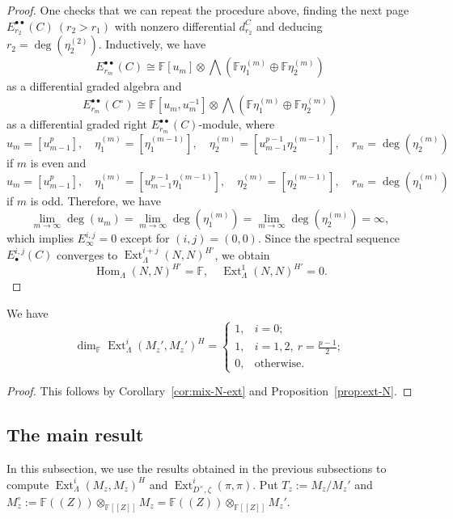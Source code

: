 \documentclass[11pt,a4paper]{article} %
\def\FF{\mathbb{F}}
\def\deg{\operatorname{deg}}
\def\dim{\operatorname{dim}}
\def\Ext{\operatorname{Ext}} %
\def\Hom{\operatorname{Hom}}
\begin{document}
\begin{proof}
    One checks that we can repeat the procedure above, finding the next page $E_{r_2}^{\bullet\bullet}(C)~(r_2>r_1)$ with nonzero differential $d_{r_2}^C$ and deducing $r_2=\deg(\eta_2^{(2)})$. Inductively, we have 
    \[
    E_{r_m}^{\bullet\bullet}(C)\cong\FF[u_m]\otimes\bigwedge(\FF\eta_1^{(m)}\oplus\FF\eta_2^{(m)})
    \]
    as a differential graded algebra and
    \[
    E_{r_m}^{\bullet\bullet}(C^\circ)\cong\FF[u_m,u_m^{-1}]\otimes\bigwedge(\FF\eta_1^{(m)}\oplus\FF\eta_2^{(m)})
    \]
    as a differential graded right $E_{r_m}^{\bullet\bullet}(C)$-module, where
    \[
    u_m=[u_{m-1}^p],\quad\eta_1^{(m)}=[\eta_1^{(m-1)}],\quad\eta_2^{(m)}=[u_{m-1}^{p-1}\eta_2^{(m-1)}],\quad r_m=\deg(\eta_2^{(m)})
    \]
    if $m$ is even and
    \[
    u_m=[u_{m-1}^p],\quad\eta_1^{(m)}=[u_{m-1}^{p-1}\eta_1^{(m-1)}],\quad\eta_2^{(m)}=[\eta_2^{(m-1)}],\quad r_m=\deg(\eta_1^{(m)})
    \]
    if $m$ is odd. Therefore, we have
    \[
    \lim_{m\to\infty}\deg(u_m)=\lim_{m\to\infty}\deg(\eta_1^{(m)})=\lim_{m\to\infty}\deg(\eta_2^{(m)})=\infty,
    \]
    which implies $E_{\infty}^{i,j}=0$ except for $(i,j)=(0,0)$. Since the spectral sequence $E_\bullet^{i,j}(C)$ converges to $\Ext^{i+j}_{\Lambda}(N,N)^{H'}$, we obtain
    \[
    \Hom_\Lambda(N,N)^{H'}=\FF,\quad\Ext^1_{\Lambda}(N,N)^{H'}=0.
    \]
\end{proof}

\begin{corollary}\label{cor:Mz'-ext}
    We have
    \[
    \dim_\FF\Ext^i_{\Lambda}(M_z',M_z')^{H}= 
    \begin{cases}
        1,&i=0;\\
        1,&i=1,2,~r=\frac{p-1}{2};\\
        0,&\text{otherwise}.            
    \end{cases}
    \]
\end{corollary}

\begin{proof}
    This follows by Corollary~\ref{cor:mix-N-ext} and Proposition~\ref{prop:ext-N}.
\end{proof}

\subsection{The main result}

In this subsection, we use the results obtained in the previous subsections to compute $\Ext^i_\Lambda(M_z,M_z)^H$ and $\Ext^i_{D^\times,\zeta}(\pi,\pi)$. Put $T_z:=M_z/M_z'$ and $M_z^\circ:=\FF((Z))\otimes_{\FF[[Z]]}M_z=\FF((Z))\otimes_{\FF[[Z]]}M_z'$.
\end{document}
